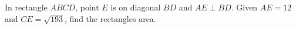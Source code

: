 In rectangle $ABCD$, point $E$ is on diagonal $BD$ and $AE\perp BD$. Given $AE=12$ and $CE=\sqrt{193}$, find the rectangle\textquotesingle s area.
